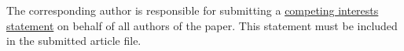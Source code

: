 \documentclass[fleqn,10pt]{wlscirep}
\begin{document}
The corresponding author is responsible for submitting a \href{http://www.nature.com/srep/policies/index.html#competing}{competing interests statement} on behalf of all authors of the paper. This statement must be included in the submitted article file.




\end{document}
